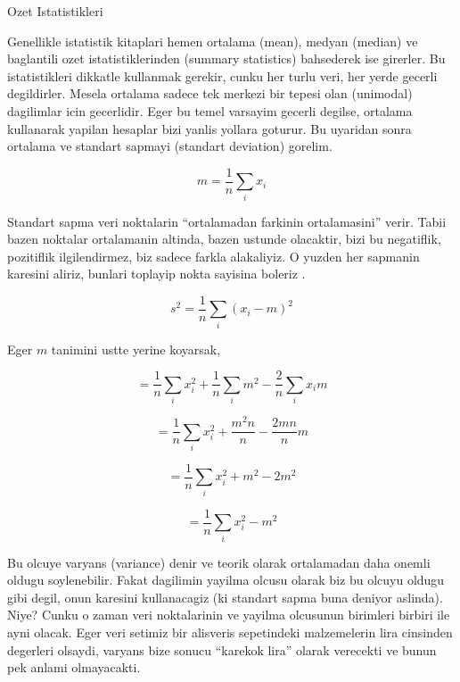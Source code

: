 \documentclass[12pt,fleqn]{article}\usepackage{../common}
\begin{document}
Ozet Istatistikleri 

Genellikle istatistik kitaplari hemen ortalama (mean), medyan (median) ve
baglantili ozet istatistiklerinden (summary statistics) bahsederek ise
girerler. Bu istatistikleri dikkatle kullanmak gerekir, cunku her turlu
veri, her yerde gecerli degildirler. Mesela ortalama sadece tek merkezi bir
tepesi olan (unimodal) dagilimlar icin gecerlidir. Eger bu temel varsayim
gecerli degilse, ortalama kullanarak yapilan hesaplar bizi yanlis yollara
goturur. Bu uyaridan sonra ortalama ve standart sapmayi (standart
deviation) gorelim. 

\[ m  = \frac{ 1}{n}\sum_i x_i \]

Standart sapma veri noktalarin ``ortalamadan farkinin ortalamasini''
verir. Tabii bazen noktalar ortalamanin altinda, bazen ustunde olacaktir,
bizi bu negatiflik, pozitiflik ilgilendirmez, biz sadece farkla
alakaliyiz. O yuzden her sapmanin karesini aliriz, bunlari toplayip nokta
sayisina boleriz .

\[ s^2 = \frac{ 1}{n} \sum_i (x_i - m)^2 \]

Eger $m$ tanimini ustte yerine koyarsak, 

\[ = \frac{ 1}{n} \sum_i x_i^2 + \frac{ 1}{n} \sum_i m^2 - \frac{ 2}{n} \sum_i x_im  \]

\[ = \frac{ 1}{n} \sum_i x_i^2 + \frac{ m^2n}{n} - \frac{ 2mn}{n}m \]

\[ = \frac{ 1}{n} \sum_i x_i^2 +  m^2 - 2m^2 \]

\[ = \frac{ 1}{n} \sum_i x_i^2 - m^2 \]

Bu olcuye varyans (variance) denir ve teorik olarak ortalamadan daha onemli
oldugu soylenebilir. Fakat dagilimin yayilma olcusu olarak biz bu olcuyu
oldugu gibi degil, onun karesini kullanacagiz (ki standart sapma buna
deniyor aslinda). Niye? Cunku o zaman veri noktalarinin ve yayilma olcusunun
birimleri birbiri ile ayni olacak. Eger veri setimiz bir alisveris
sepetindeki malzemelerin lira cinsinden degerleri olsaydi, varyans bize
sonucu ``karekok lira'' olarak verecekti ve bunun pek anlami olmayacakti. 
\end{document}
